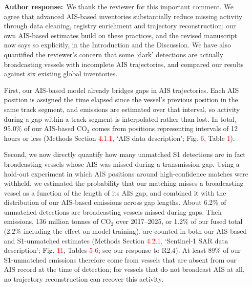 \documentclass[11pt]{article}
\newcommand{\response}{\par\medskip\noindent%
  \textbf{\textcolor{respblue}{Author response:}}\ }
\begin{document}
\response We thank the reviewer for this important comment. We agree that advanced AIS-based inventories substantially reduce missing activity through data cleaning, registry enrichment and trajectory reconstruction; our own AIS-based estimates build on these practices, and the revised manuscript now says so explicitly, in the Introduction and the Discussion. We have also quantified the reviewer's concern that some `dark' detections are actually broadcasting vessels with incomplete AIS trajectories, and compared our results against six existing global inventories.

First, our AIS-based model already bridges gaps in AIS trajectories. Each AIS position is assigned the time elapsed since the vessel's previous position in the same track segment, and emissions are estimated over that interval, so activity during a gap within a track segment is interpolated rather than lost. In total, 95.0\% of our AIS-based CO$_2$ comes from positions representing intervals of 12 hours or less (Methods Section \textcolor{red}{4.1.1}, `AIS data description'; Fig. \textcolor{red}{6}, Table \textcolor{red}{1}).

Second, we now directly quantify how many unmatched S1 detections are in fact broadcasting vessels whose AIS was missed during a transmission gap. Using a hold-out experiment in which AIS positions around high-confidence matches were withheld, we estimated the probability that our matching misses a broadcasting vessel as a function of the length of its AIS gap, and combined it with the distribution of our AIS-based emissions across gap lengths. About 6.2\% of unmatched detections are broadcasting vessels missed during gaps. Their emissions, 136 million tonnes of CO$_2$ over 2017--2025, or 1.2\% of our fused total (2.2\% including the effect on model training), are counted in both our AIS-based and S1-unmatched estimates (Methods Section \textcolor{red}{4.2.1}, `Sentinel-1 SAR data description'; Fig. \textcolor{red}{11}, Tables \textcolor{red}{5-6}; see our response to R2.4). At least 89\% of our S1-unmatched emissions therefore come from vessels that are absent from our AIS record at the time of detection; for vessels that do not broadcast AIS at all, no trajectory reconstruction can recover this activity.
\end{document}
